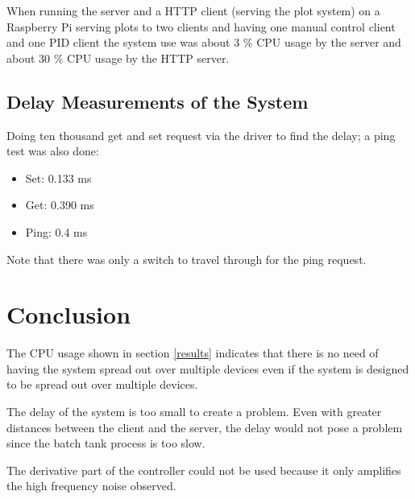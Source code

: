 \documentclass{article}
\begin{document}
When running the server and a HTTP client (serving the plot system) on a
Raspberry Pi serving plots to two clients and having one manual control client
and one PID client the system use was about 3 \% CPU usage by the server and 
about 30 \% CPU usage by the HTTP server.


\subsection{Delay Measurements of the System}
Doing ten thousand get and set request via the driver to find the delay; a ping test was also done: 
\begin{itemize}
\item{Set: 0.133 ms}
\item{Get: 0.390 ms}
\item{Ping: 0.4 ms} 
\end{itemize}

Note that there was only a switch to travel through for the ping request.


\section{Conclusion}
The CPU usage shown in section \ref{results} indicates that there is no need of having
the system spread out over multiple devices even if the system is designed to be spread out over
multiple devices.

The delay of the system is too small to create a problem. Even with greater distances between the client and the server, the delay would not pose a problem since the batch tank process is too slow.

The derivative part of the controller could not be used because it only
amplifies the high frequency noise observed.

\newpage
\end{document}
